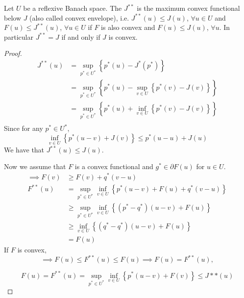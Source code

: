 \begin{theorem}
	Let $U$ be a reflexive Banach space. The $J^{**}$ is the maximum convex functional below $J$ (also called convex envelope), i.e. $J^{**}(u)\leq J(u)$, $\forall u \in U$ and $F(u)\leq J^{**}(u)$, $\forall u \in U$ if $F$ is also convex and $F(u)\leq J(u)$, $\forall u$. In particular $J^{**}=J$ if and only if $J$ is convex.
	\begin{proof}
		\begin{align}
			J^{**}(u)&=\sup_{p^*\in U^*} \left\lbrace p^*(u)-J^*(p^*) \right\rbrace\\
					&=\sup_{p^*\in U^*} \left\lbrace p^*(u)-\sup_{v\in U}\left\lbrace p^*(v)-J(v)\right\rbrace\right\rbrace\\
					&=\sup_{p^*\in U^*} \left\lbrace p^*(u)+\inf_{v\in U}\left\lbrace p^*(v)-J(v)\right\rbrace\right\rbrace\\
		\end{align}
		Since for any $p^* \in U^*$,
			\[
				\inf_{v\in U}\left\lbrace p^* \left(u-v\right)+J(v) \right\rbrace \leq p^*(u-u)+J(u)
			\]
		We have that $J^{**}(u)\leq J(u)$.
		
		Now we assume that $F$ is a convex functional and $g^* \in \partial F(u)$ for $u \in U$.
		\begin{align}
			\implies  F(v)&\geq F(v)+q^*(v-u)\\
					  F^{**}(u)& = \sup_{p^* \in U^*} \inf_{v \in U} \left\lbrace p^*(u-v)+F(u)+q^*(v-u)\right\rbrace \\
					  &\geq \sup_{p^* \in U^*} \inf_{v \in U} \left\lbrace \left(p^*-q^*\right)(u-v)+F(u)\right\rbrace\\
					  &\geq \inf_{v \in U} \left\lbrace (q^*-q^*)(u-v)+F(u) \right\rbrace\\
					  &=F(u)
		\end{align}
	If $F$ is convex,
	\begin{equation}
		\implies F(u)\leq F^{**}(u)\leq F(u) \implies F(u)=F^{**}(u),
	\end{equation}

	\begin{equation}
	F(u)=F^{**}(u)=\sup_{p^* \in U^*} \inf_{v \in U} \left\lbrace p^*(u-v)+F(v)\right\rbrace \leq J**(u)
	\end{equation}
	\end{proof}
\end{theorem}
